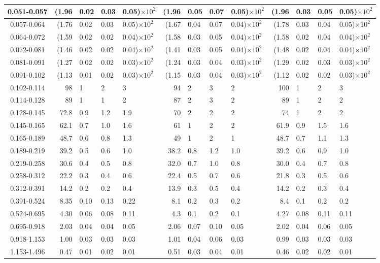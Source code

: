 \begin{table}[!htbp]
{\begin{tabular}{ | c | r@{$\pm$}l@{$\pm$}l@{$\pm$}l | r@{$\pm$}l@{$\pm$}l@{$\pm$}l | r@{$\pm$}l@{$\pm$}l@{$\pm$}l |}
0.051-0.057 & (1.96&0.02&0.03&0.05)$\times 10^{2}$ & (1.96&0.05&0.07&0.05)$\times 10^{2}$ & (1.96&0.03&0.05&0.05)$\times 10^{2}$ \\ \hline
0.057-0.064 & (1.76&0.02&0.03&0.05)$\times 10^{2}$ & (1.67&0.04&0.07&0.04)$\times 10^{2}$ & (1.78&0.03&0.04&0.05)$\times 10^{2}$ \\ \hline
0.064-0.072 & (1.59&0.02&0.02&0.04)$\times 10^{2}$ & (1.58&0.03&0.05&0.04)$\times 10^{2}$ & (1.58&0.02&0.04&0.04)$\times 10^{2}$ \\ \hline
0.072-0.081 & (1.46&0.02&0.02&0.04)$\times 10^{2}$ & (1.41&0.03&0.05&0.04)$\times 10^{2}$ & (1.48&0.02&0.04&0.04)$\times 10^{2}$ \\ \hline
0.081-0.091 & (1.27&0.02&0.02&0.03)$\times 10^{2}$ & (1.24&0.03&0.04&0.03)$\times 10^{2}$ & (1.29&0.02&0.03&0.03)$\times 10^{2}$ \\ \hline
0.091-0.102 & (1.13&0.01&0.02&0.03)$\times 10^{2}$ & (1.15&0.03&0.04&0.03)$\times 10^{2}$ & (1.12&0.02&0.02&0.03)$\times 10^{2}$ \\ \hline
0.102-0.114 & 98&1&2&3 & 94&2&3&2 & 100&1&2&3 \\ \hline
0.114-0.128 & 89&1&1&2 & 87&2&3&2 & 89&1&2&2 \\ \hline
0.128-0.145 & 72.8&0.9&1.2&1.9 & 70&2&2&2 & 74&1&2&2 \\ \hline
0.145-0.165 & 62.1&0.7&1.0&1.6 & 61&1&2&2 & 61.9&0.9&1.5&1.6 \\ \hline
0.165-0.189 & 48.7&0.6&0.8&1.3 & 49&1&2&1 & 48.7&0.7&1.1&1.3 \\ \hline
0.189-0.219 & 39.2&0.5&0.6&1.0 & 38.2&0.8&1.2&1.0 & 39.2&0.6&0.9&1.0 \\ \hline
0.219-0.258 & 30.6&0.4&0.5&0.8 & 32.0&0.7&1.0&0.8 & 30.0&0.4&0.7&0.8 \\ \hline
0.258-0.312 & 22.2&0.3&0.4&0.6 & 22.4&0.5&0.7&0.6 & 21.8&0.3&0.5&0.6 \\ \hline
0.312-0.391 & 14.2&0.2&0.2&0.4 & 13.9&0.3&0.5&0.4 & 14.2&0.2&0.3&0.4 \\ \hline
0.391-0.524 & 8.35&0.10&0.13&0.22 & 8.1&0.2&0.3&0.2 & 8.4&0.1&0.2&0.2 \\ \hline
0.524-0.695 & 4.30&0.06&0.08&0.11 & 4.3&0.1&0.2&0.1 & 4.27&0.08&0.11&0.11 \\ \hline
0.695-0.918 & 2.03&0.04&0.04&0.05 & 2.06&0.07&0.10&0.05 & 2.02&0.04&0.06&0.05 \\ \hline
0.918-1.153 & 1.00&0.03&0.03&0.03 & 1.01&0.04&0.06&0.03 & 0.99&0.03&0.03&0.03 \\ \hline
1.153-1.496 & 0.47&0.01&0.02&0.01 & 0.51&0.03&0.04&0.01 & 0.46&0.02&0.02&0.01 \\ \hline

\end{tabular}}
\end{table}
